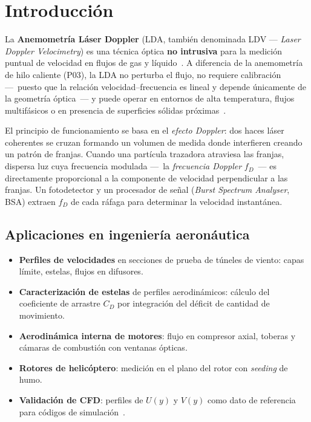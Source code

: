 \documentclass[12pt,a4paper]{article}
\begin{document}
\section{Introducción}
\label{sec:intro}

La \textbf{Anemometría Láser Doppler} (LDA, también denominada LDV ---
\emph{Laser Doppler Velocimetry}) es una técnica óptica \textbf{no
	intrusiva} para la medición puntual de velocidad en flujos de gas y
líquido~\cite{durst1981}.  A diferencia de la anemometría de hilo caliente
(P03), la LDA no perturba el flujo, no requiere calibración ---~puesto que
la relación velocidad--frecuencia es lineal y depende únicamente de la
geometría óptica~--- y puede operar en entornos de alta temperatura, flujos
multifásicos o en presencia de superficies sólidas
próximas~\cite{albrecht2003}.

El principio de funcionamiento se basa en el \emph{efecto Doppler}: dos
haces láser coherentes se cruzan formando un volumen de medida donde
interfieren creando un patrón de franjas.  Cuando una partícula trazadora
atraviesa las franjas, dispersa luz cuya frecuencia modulada ---~la
\emph{frecuencia Doppler} $f_D$~--- es directamente proporcional a la
componente de velocidad perpendicular a las franjas.  Un fotodetector y un
procesador de señal (\emph{Burst Spectrum Analyser}, BSA) extraen $f_D$ de
cada ráfaga para determinar la velocidad instantánea.

\subsection{Aplicaciones en ingeniería aeronáutica}

\begin{itemize}
	\item \textbf{Perfiles de velocidades} en secciones de prueba de túneles
	      de viento: capas límite, estelas, flujos en difusores.
	\item \textbf{Caracterización de estelas} de perfiles aerodinámicos:
	      cálculo del coeficiente de arrastre $C_D$ por integración del
	      déficit de cantidad de movimiento.
	\item \textbf{Aerodinámica interna de motores}: flujo en compresor axial,
	      toberas y cámaras de combustión con ventanas ópticas.
	\item \textbf{Rotores de helicóptero}: medición en el plano del rotor con
	      \emph{seeding} de humo.
	\item \textbf{Validación de CFD}: perfiles de $U(y)$ y $V(y)$ como dato
	      de referencia para códigos de simulación~\cite{pope2000}.
\end{itemize}
\end{document}
